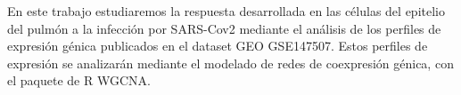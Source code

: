 		
		\noindent En este trabajo estudiaremos la respuesta desarrollada en las células del epitelio del pulmón a la infección por SARS-Cov2 mediante el análisis de los perfiles de expresión génica publicados en el dataset GEO GSE147507. Estos perfiles de expresión se analizarán mediante el modelado de redes de coexpresión génica, con el paquete de R WGCNA.
		

	

